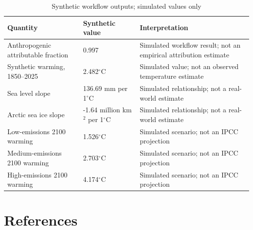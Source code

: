 \documentclass[12pt]{article}
\begin{document}
\begin{table}[htbp]
\centering
\caption{Synthetic workflow outputs; simulated values only}
\begin{tabularx}{\textwidth}{p{4.2cm}p{3cm}Y}
\toprule
Quantity & Synthetic value & Interpretation \\
\midrule
Anthropogenic attributable fraction & 0.997 & Simulated workflow result; not an empirical attribution estimate \\
Synthetic warming, 1850--2025 & 2.482$^\circ$C & Simulated value; not an observed temperature estimate \\
Sea level slope & 136.69 mm per 1$^\circ$C & Simulated relationship; not a real-world estimate \\
Arctic sea ice slope & -1.64 million km$^2$ per 1$^\circ$C & Simulated relationship; not a real-world estimate \\
Low-emissions 2100 warming & 1.526$^\circ$C & Simulated scenario; not an IPCC projection \\
Medium-emissions 2100 warming & 2.703$^\circ$C & Simulated scenario; not an IPCC projection \\
High-emissions 2100 warming & 4.174$^\circ$C & Simulated scenario; not an IPCC projection \\
\bottomrule
\end{tabularx}
\end{table}

\section{References}
\end{document}

